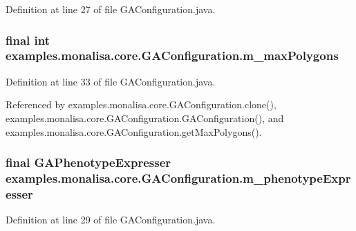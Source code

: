 Definition at line 27 of file G\-A\-Configuration.\-java.

\hypertarget{classexamples_1_1monalisa_1_1core_1_1_g_a_configuration_ae59b653400e21a41a9fcde914a1bc6d9}{
\subsubsection[{m\-\_\-max\-Polygons}]{\setlength{\rightskip}{0pt plus 5cm}final int examples.\-monalisa.\-core.\-G\-A\-Configuration.\-m\-\_\-max\-Polygons\hspace{0.3cm}{\ttfamily [private]}}}\label{classexamples_1_1monalisa_1_1core_1_1_g_a_configuration_ae59b653400e21a41a9fcde914a1bc6d9}


Definition at line 33 of file G\-A\-Configuration.\-java.



Referenced by examples.\-monalisa.\-core.\-G\-A\-Configuration.\-clone(), examples.\-monalisa.\-core.\-G\-A\-Configuration.\-G\-A\-Configuration(), and examples.\-monalisa.\-core.\-G\-A\-Configuration.\-get\-Max\-Polygons().

\hypertarget{classexamples_1_1monalisa_1_1core_1_1_g_a_configuration_ace0ab91616134a8d26a2d6a4ff6e1237}{
\subsubsection[{m\-\_\-phenotype\-Expresser}]{\setlength{\rightskip}{0pt plus 5cm}final {\bf G\-A\-Phenotype\-Expresser} examples.\-monalisa.\-core.\-G\-A\-Configuration.\-m\-\_\-phenotype\-Expresser\hspace{0.3cm}{\ttfamily [private]}}}\label{classexamples_1_1monalisa_1_1core_1_1_g_a_configuration_ace0ab91616134a8d26a2d6a4ff6e1237}


Definition at line 29 of file G\-A\-Configuration.\-java.



